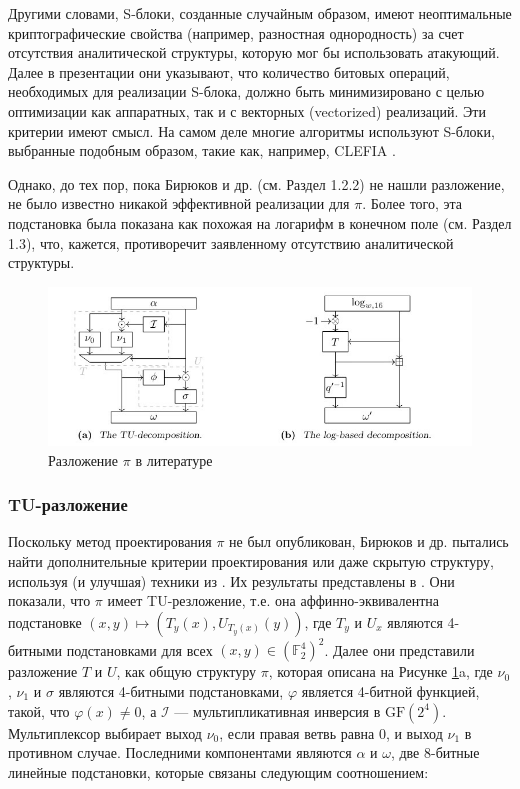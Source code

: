 Другими словами, S-блоки, созданные случайным образом, имеют неоптимальные криптографические свойства (например, разностная однородность) за счет отсутствия аналитической структуры, которую мог бы использовать атакующий. Далее в презентации они указывают, что количество битовых операций, необходимых для реализации S-блока, должно быть минимизировано с целью оптимизации как аппаратных, так и с векторных (vectorized) реализаций. Эти критерии имеют смысл. На самом деле многие алгоритмы используют S-блоки, выбранные подобным образом, такие как, например, CLEFIA \cite{SSA+07}.

Однако, до тех пор, пока Бирюков и др. \cite{BPU16a} (см. Раздел 1.2.2) не нашли разложение, не было известно никакой эффективной реализации для \(\pi\). Более того, эта подстановка была показана как похожая на логарифм в конечном поле \cite{PU16} (см. Раздел 1.3), что, кажется, противоречит заявленному отсутствию аналитической структуры.

\begin{figure}
        \centering
        \includegraphics[scale=0.9]{contents/pics/decomposite.png}
        \caption{Разложение \(\pi\) в литературе}
        \label{fig:fig01}
\end{figure}

\subsubsection{TU-разложение}
Поскольку метод проектирования \(\pi\) не был опубликован, Бирюков и др. пытались найти дополнительные критерии проектирования или даже скрытую структуру, используя (и улучшая) техники из \cite{BP15}. Их результаты представлены в \cite{BPU16a, BPU16b}. Они показали, что \(\pi\) имеет TU-резложение, т.е. она аффинно-эквивалентна подстановке \((x, y) \mapsto (T_y(x), U_{T_y(x)}(y))\), где \(T_y\) и \(U_x\) являются 4-битными подстановками для всех \((x, y) \in (\mathbb{F}_2^4)^2\). Далее они представили разложение \(T\) и \(U\), как общую структуру \(\pi\), которая описана на Рисунке \ref{fig:fig01}a, где \(\nu_0\), \(\nu_1\) и \(\sigma\) являются 4-битными подстановками, \(\varphi\) является 4-битной функцией, такой, что \(\varphi(x) \neq 0\), а \(\mathcal{I}\) — мультипликативная инверсия в \(\text{GF}(2^4)\). Мультиплексор выбирает выход \(\nu_0\), если правая ветвь равна 0, и выход \(\nu_1\) в противном случае. Последними компонентами являются \(\alpha\) и \(\omega\), две 8-битные линейные подстановки, которые связаны следующим соотношением:

